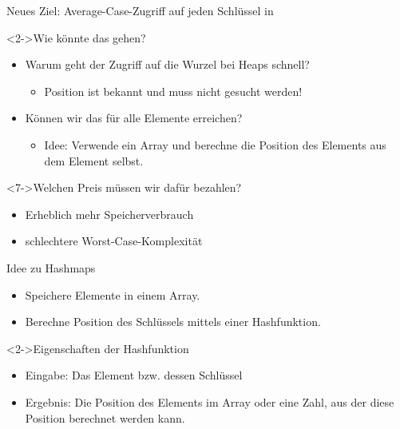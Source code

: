 \begin{frame}
    \begin{block}{Neues Ziel: Average-Case-Zugriff auf jeden Schlüssel in \alert{\oconst}}
    \end{block}
    \begin{block}<2->{Wie könnte das gehen?}
        \begin{itemize}
            \item<3-> Warum geht der Zugriff auf die Wurzel bei Heaps schnell?
            \begin{itemize}
                \item<4-> Position ist bekannt und muss nicht gesucht werden!
            \end{itemize}
            \item<5-> Können wir das für alle Elemente erreichen?
            \begin{itemize}
                \item<6-> Idee: Verwende ein Array und berechne
                      die Position des Elements aus dem Element selbst.
            \end{itemize}
        \end{itemize}
    \end{block}
    \begin{block}<7->{Welchen Preis müssen wir dafür bezahlen?}
        \begin{itemize}
            \item<8-> Erheblich mehr Speicherverbrauch 
            \item<8-> schlechtere Worst-Case-Komplexität
        \end{itemize}
    \end{block}
\end{frame}

\begin{frame}
    \begin{block}{Idee zu Hashmaps}
        \begin{itemize}
            \item Speichere Elemente in einem Array.
            \item Berechne Position des Schlüssels mittels einer \alert{Hashfunktion}.
        \end{itemize}
    \end{block}
    \begin{block}<2->{Eigenschaften der Hashfunktion}
        \begin{itemize}
            \item Eingabe: Das Element bzw. dessen Schlüssel
            \item Ergebnis: Die Position des Elements im Array oder eine Zahl,
                  aus der diese Position berechnet werden kann.
        \end{itemize}
    \end{block}
\end{frame}

